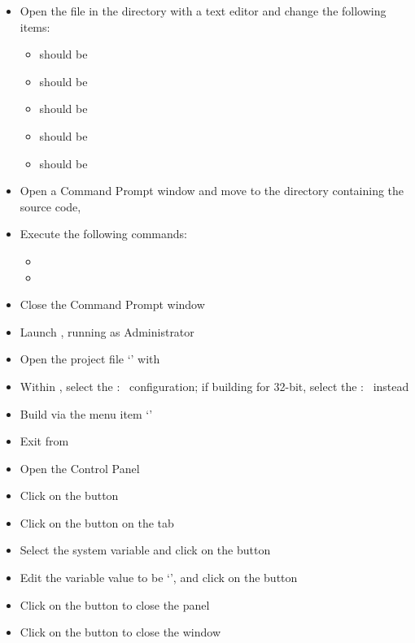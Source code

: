 \tertiaryEnd
{}
\begin{itemize}
\item Open the file  in the
 directory with a text editor and change the
following items:
\begin{itemize}
\item {} should be 
\item\exSp{} should be 
\item\exSp{} should be 
\item\exSp{} should be 
\item\exSp{} should be 
\end{itemize}
\item\exSp{}Open a Command Prompt window and move to the directory containing the
\mplusm{} source code, 
\item\exSp{}Execute the following commands:
\begin{itemize}
\item {}
\item\exSp{}
\end{itemize}
\item\exSp{}Close the Command Prompt window
\item\exSp{}Launch , running as Administrator
\item\exSp{}Open the project file
`' with
\item\exSp{}Within , select the  :\ 
configuration; if building for 32-bit, select the  :\ 
instead
\item\exSp{}Build via the menu item `'
\item\exSp{}Exit from 
\item\exSp{}Open the  Control Panel
\item\exSp{}Click on the  button
\item\exSp{}Click on the  button on the 
tab
\item\exSp{}Select the  system variable and click on the 
button 
\item\exSp{}Edit the variable value to be `',
and click on the  button
\item\exSp{}Click on the  button to close the 
panel
\item\exSp{}Click on the  button to close the 
window
\end{itemize}
